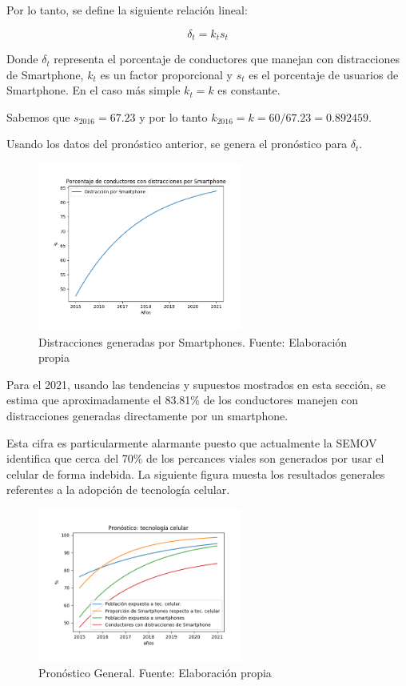 \documentclass{article}
\begin{document}
Por lo tanto, se define la siguiente relación lineal:

\begin{equation}
\delta_t = k_t s_t
\end{equation}

Donde $\delta_t$ representa el porcentaje de conductores que manejan con distracciones de Smartphone,
$k_t$ es un factor proporcional y $s_t$ es el porcentaje de usuarios de Smartphone. En el caso más
simple $k_t = k$ es constante.


Sabemos que $s_{2016} = 67.23$ y por lo tanto $k_{2016} = k = 60/67.23 = 0.892459$.

Usando los datos del pronóstico anterior, se genera el pronóstico para $\delta_t$.

	\begin{figure}[H]\centering
	\includegraphics[width=0.6\textwidth]{resources/img/distraction.png}
	\caption{\label{fig:distr} Distracciones generadas por Smartphones. Fuente: Elaboración propia}
    \end{figure}

Para el 2021, usando las tendencias y supuestos mostrados en esta sección, se estima
que aproximadamente el 83.81\% de los conductores manejen con distracciones generadas
directamente por un smartphone.

Esta cifra es particularmente alarmante puesto que actualmente la SEMOV identifica
que cerca del 70\% de los percances viales son generados por usar el celular de
forma indebida. La siguiente figura muesta los resultados generales referentes a la adopción de
tecnología celular.

	\begin{figure}[H]\centering
	\includegraphics[width=0.6\textwidth]{resources/img/smartphone_complete_forecast.png}
	\caption{\label{fig:compare_forecast} Pronóstico General. Fuente: Elaboración propia}
    \end{figure}
\end{document}
